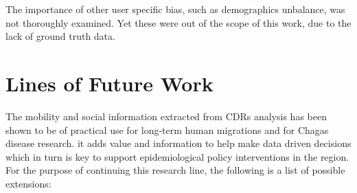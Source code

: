 The importance of other user specific bias, such as demographics unbalance, was not thoroughly examined.
Yet these were out of the scope of this work, due to the lack of ground truth data. 


\section{ Lines of Future Work }


The mobility and social information extracted from CDRs analysis has been shown to be of practical use for long-term human migrations and for Chagas disease research.
it adds value and information to help make data driven decisions which in turn is key to support epidemiological policy interventions in the region.
For the purpose of continuing this research line, the following is a list of possible extensions:


